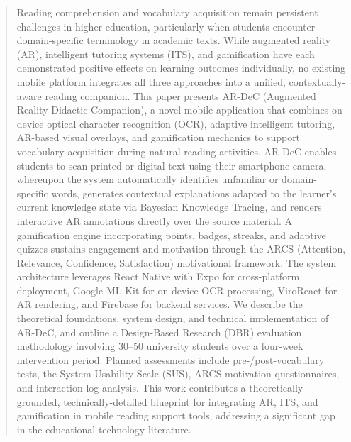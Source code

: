 
\begin{abstract}
Reading comprehension and vocabulary acquisition remain persistent challenges in higher education, particularly when students encounter domain-specific terminology in academic texts. While augmented reality (AR), intelligent tutoring systems (ITS), and gamification have each demonstrated positive effects on learning outcomes individually, no existing mobile platform integrates all three approaches into a unified, contextually-aware reading companion. This paper presents AR-DeC (Augmented Reality Didactic Companion), a novel mobile application that combines on-device optical character recognition (OCR), adaptive intelligent tutoring, AR-based visual overlays, and gamification mechanics to support vocabulary acquisition during natural reading activities. AR-DeC enables students to scan printed or digital text using their smartphone camera, whereupon the system automatically identifies unfamiliar or domain-specific words, generates contextual explanations adapted to the learner's current knowledge state via Bayesian Knowledge Tracing, and renders interactive AR annotations directly over the source material. A gamification engine incorporating points, badges, streaks, and adaptive quizzes sustains engagement and motivation through the ARCS (Attention, Relevance, Confidence, Satisfaction) motivational framework. The system architecture leverages React Native with Expo for cross-platform deployment, Google ML Kit for on-device OCR processing, ViroReact for AR rendering, and Firebase for backend services. We describe the theoretical foundations, system design, and technical implementation of AR-DeC, and outline a Design-Based Research (DBR) evaluation methodology involving 30--50 university students over a four-week intervention period. Planned assessments include pre-/post-vocabulary tests, the System Usability Scale (SUS), ARCS motivation questionnaires, and interaction log analysis. This work contributes a theoretically-grounded, technically-detailed blueprint for integrating AR, ITS, and gamification in mobile reading support tools, addressing a significant gap in the educational technology literature.
\end{abstract}
